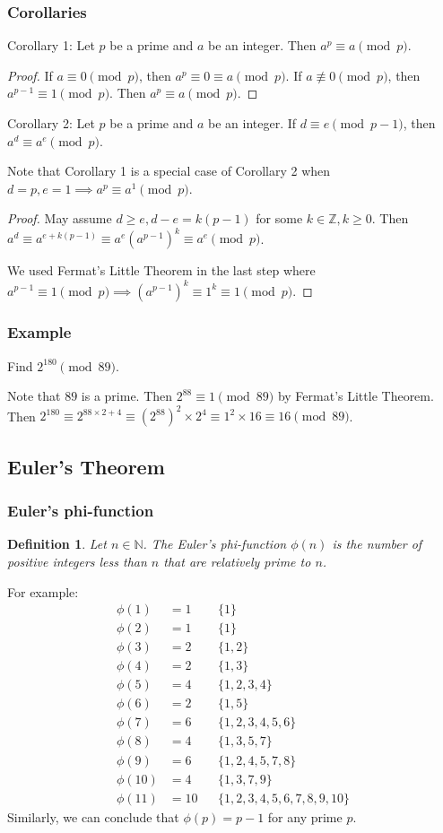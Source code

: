 \documentclass[letterpaper,12pt,oneside]{article}
\newtheorem{definition}{Definition}
\begin{document}
\subsubsection{Corollaries}
Corollary 1: Let $p$ be a prime and $a$ be an integer. Then $a^p\equiv a \pmod p$.
\begin{proof}
    If $a \equiv 0 \pmod p$, then $a^p\equiv 0 \equiv a \pmod p$. If $a\not\equiv 0 \pmod p$, then $a^{p-1}\equiv 1 \pmod p$. Then $a^p\equiv a \pmod p$.
\end{proof}
Corollary 2: Let $p$ be a prime and $a$ be an integer. If $d \equiv e \pmod {p-1}$, then $a^d\equiv a^e \pmod p$.

Note that Corollary 1 is a special case of Corollary 2 when $d=p,e=1 \implies a^p\equiv a^1 \pmod p$.
\begin{proof}
    May assume $d \ge e, d-e = k (p-1)$ for some $k\in \mathbb{Z},k\ge 0$. Then $a^d\equiv a^{e+k(p-1)}\equiv a^e(a^{p-1})^k\equiv a^e \pmod p$.

    We used Fermat's Little Theorem in the last step where $a^{p-1}\equiv 1 \pmod p \implies (a^{p-1})^k\equiv 1^k\equiv 1 \pmod p$.
\end{proof}
\subsubsection{Example}
Find $2^{180}\pmod {89}$.

Note that $89$ is a prime. Then $2^{88}\equiv 1 \pmod {89}$ by Fermat's Little Theorem. Then $2^{180}\equiv 2^{88\times 2+4}\equiv (2^{88})^2\times 2^4\equiv 1^2\times 16\equiv 16 \pmod {89}$.
\subsection{Euler's Theorem}
\subsubsection{Euler's phi-function}
\begin{definition}
    Let $n\in \mathbb{N}$. The Euler's phi-function $\phi(n)$ is the number of positive integers less than $n$ that are relatively prime to $n$.
\end{definition}
For example: \begin{align*}
    \phi (1) & = 1 && \{1\} \\
    \phi (2) & = 1 && \{1\} \\
    \phi (3) & = 2 && \{1,2\} \\
    \phi (4) & = 2 && \{1,3\} \\
    \phi (5) & = 4 && \{1,2,3,4\} \\
    \phi (6) & = 2 && \{1,5\} \\
    \phi (7) & = 6 && \{1,2,3,4,5,6\} \\
    \phi (8) & = 4 && \{1,3,5,7\} \\
    \phi (9) & = 6 && \{1,2,4,5,7,8\} \\
    \phi (10) & = 4 && \{1,3,7,9\} \\
    \phi (11) & = 10 && \{1,2,3,4,5,6,7,8,9,10\} 
\end{align*}
Similarly, we can conclude that $\phi(p)=p-1$ for any prime $p$.
\end{document}
